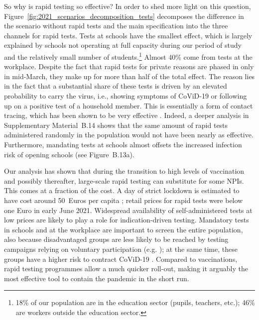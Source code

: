 \documentclass[12pt]{article}
\begin{document}
So why is rapid testing so effective? In order to shed more light on this question,
Figure~\ref{fig:2021_scenarios_decomposition_tests} decomposes the difference in the
scenario without rapid tests and the main specification into the three channels for
rapid tests. Tests at schools have the smallest effect, which is largely explained by
schools not operating at full capacity during our period of study and the relatively
small number of students.\footnote{18\% of our population are in the education sector
(pupils, teachers, etc.); 46\% are workers outside the education sector.} Almost 40\%
come from tests at the workplace. Despite the fact that rapid tests for private reasons
are phased in only in mid-March, they make up for more than half of the total effect.
The reason lies in the fact that a substantial share of these tests is driven by an
elevated probability to carry the virus, i.e., showing symptoms of CoViD-19 or following
up on a positive test of a household member. This is essentially a form of contact
tracing, which has been shown to be very effective \cite{Contreras2021,
Fetzer2021,Kretzschmar2020}. Indeed, a deeper analysis in Supplementary Material~B.14
shows that the same amount of rapid tests administered randomly in the population would
not have been nearly as effective. Furthermore, mandating tests at schools almost
offsets the increased infection risk of opening schools (see Figure~B.13a).

Our analysis has shown that during the transition to high levels of vaccination and
possibly thereafter, large-scale rapid testing can substitute for some NPIs. This comes
at a fraction of the cost. A day of strict lockdown is estimated to have cost around
50~Euros per capita \cite{Dorn2020b}; retail prices for rapid tests were below one Euro
in early June 2021. Widespread availability of self-administered tests at low prices are
likely to play a role for indication-driven testing. Mandatory tests in schools and at
the workplace are important to screen the entire population, also because disadvantaged
groups are less likely to be reached by testing campaigns relying on voluntary
participation (e.g. \cite{StillmanTonin2021}); at the same time, these groups have a
higher risk to contract CoViD-19 \cite{KochInstitut2021a}. Compared to vaccinations,
rapid testing programmes allow a much quicker roll-out, making it arguably the most
effective tool to contain the pandemic in the short run.

% 
% 
\end{document}
